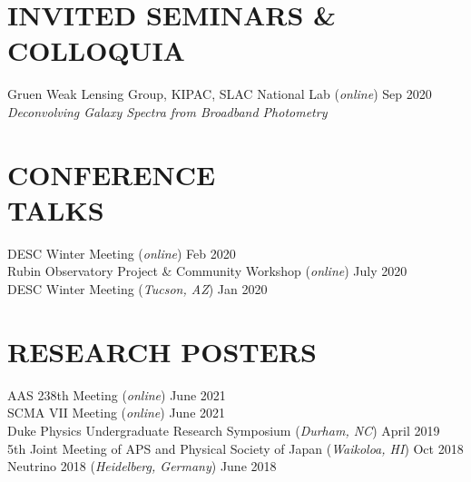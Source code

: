 \documentclass[margin]{res}
\begin{document}
\begin{resume}
\section{\normalfont INVITED SEMINARS \& COLLOQUIA}

Gruen Weak Lensing Group, KIPAC, SLAC National Lab (\textit{online}) \hfill Sep 2020 \\
\textit{Deconvolving Galaxy Spectra from Broadband Photometry} \\

\section{\normalfont CONFERENCE \\TALKS}

DESC Winter Meeting (\textit{online}) \hfill Feb 2020 \\
Rubin Observatory Project \& Community Workshop (\textit{online}) \hfill July 2020 \\
DESC Winter Meeting (\textit{Tucson, AZ}) \hfill Jan 2020 \\

\section{\normalfont RESEARCH POSTERS}

AAS 238th Meeting (\textit{online}) \hfill June 2021 \\
SCMA VII Meeting (\textit{online}) \hfill June 2021 \\
Duke Physics Undergraduate Research Symposium (\textit{Durham, NC}) \hfill April 2019 \\
5th Joint Meeting of APS and Physical Society of Japan (\textit{Waikoloa, HI}) \hfill Oct 2018 \\
Neutrino 2018 (\textit{Heidelberg, Germany}) \hfill June 2018 \\


\end{resume}
\end{document}
